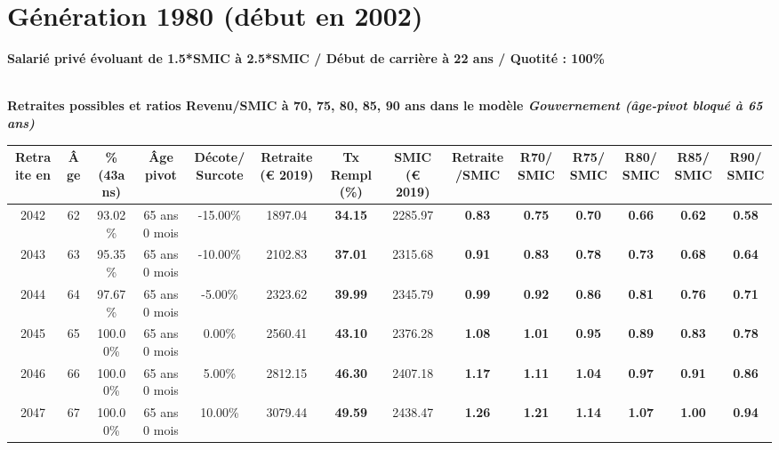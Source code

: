 \newpage 
 
\section{Génération 1980 (début en 2002)\label{Ascendant1525_100_1980_22_0}} 
 
{\bf \noindent Salarié privé évoluant de 1.5*SMIC à 2.5*SMIC / Début de carrière à 22 ans / Quotité : 100\%}  ~ 

 ~\\{\bf \noindent Retraites possibles et ratios Revenu/SMIC à 70, 75, 80, 85, 90 ans dans le modèle \emph{Gouvernement (âge-pivot bloqué à 65 ans)}}  
 
\begin{adjustbox}{max width=\textwidth} 
\begin{tabular}[htb]{|c|c||c|c|c||c|c||c|c||c|c|c|c|c|} 
\hline 
 Retraite en &  Âge &  \%(43ans) &  Âge pivot &  Décote/Surcote &  Retraite (\euro{} 2019) &  Tx Rempl(\%) &  SMIC (\euro{} 2019) &  Retraite/SMIC &  R70/SMIC &  R75/SMIC &  R80/SMIC &  R85/SMIC &  R90/SMIC \\ 
\hline \hline 
 2042 &  62 &  93.02\% &  65 ans 0 mois &  -15.00\% &  1897.04 &  {\bf 34.15} &  2285.97 &  {\bf {\color{red} 0.83}} &  {\bf {\color{red} 0.75}} &  {\bf {\color{red} 0.70}} &  {\bf {\color{red} 0.66}} &  {\bf {\color{red} 0.62}} &  {\bf {\color{red} 0.58}} \\ 
\hline 
 2043 &  63 &  95.35\% &  65 ans 0 mois &  -10.00\% &  2102.83 &  {\bf 37.01} &  2315.68 &  {\bf {\color{red} 0.91}} &  {\bf {\color{red} 0.83}} &  {\bf {\color{red} 0.78}} &  {\bf {\color{red} 0.73}} &  {\bf {\color{red} 0.68}} &  {\bf {\color{red} 0.64}} \\ 
\hline 
 2044 &  64 &  97.67\% &  65 ans 0 mois &  -5.00\% &  2323.62 &  {\bf 39.99} &  2345.79 &  {\bf {\color{red} 0.99}} &  {\bf {\color{red} 0.92}} &  {\bf {\color{red} 0.86}} &  {\bf {\color{red} 0.81}} &  {\bf {\color{red} 0.76}} &  {\bf {\color{red} 0.71}} \\ 
\hline 
 2045 &  65 &  100.00\% &  65 ans 0 mois &  0.00\% &  2560.41 &  {\bf 43.10} &  2376.28 &  {\bf 1.08} &  {\bf 1.01} &  {\bf {\color{red} 0.95}} &  {\bf {\color{red} 0.89}} &  {\bf {\color{red} 0.83}} &  {\bf {\color{red} 0.78}} \\ 
\hline 
 2046 &  66 &  100.00\% &  65 ans 0 mois &  5.00\% &  2812.15 &  {\bf 46.30} &  2407.18 &  {\bf 1.17} &  {\bf 1.11} &  {\bf 1.04} &  {\bf {\color{red} 0.97}} &  {\bf {\color{red} 0.91}} &  {\bf {\color{red} 0.86}} \\ 
\hline 
 2047 &  67 &  100.00\% &  65 ans 0 mois &  10.00\% &  3079.44 &  {\bf 49.59} &  2438.47 &  {\bf 1.26} &  {\bf 1.21} &  {\bf 1.14} &  {\bf 1.07} &  {\bf 1.00} &  {\bf {\color{red} 0.94}} \\ 
\hline 
\hline 
\end{tabular} 
\end{adjustbox} 
 
